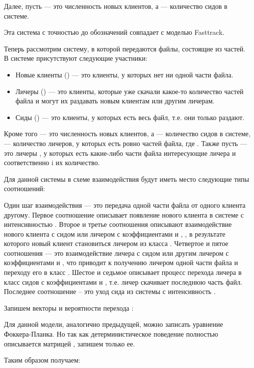 \documentclass[floatfix,
showkeys,
twocolumn, nofootinbib, superscriptaddress, ]{revtex4-1}
\begin{document}
Далее, пусть  --- это численность новых клиентов, а  ---
количество сидов в системе.

Эта система с точностью до обозначений совпадает с моделью Fasttrack.

Теперь рассмотрим систему, в которой передаются файлы, состоящие из
 частей. В системе присутствуют следующие участники:

\begin{itemize}
\item Новые клиенты () --- это клиенты, у которых нет ни одной
  части файла.
\item Личеры () --- это клиенты, которые уже скачали какое-то
  количество частей файла и могут их раздавать новым клиентам или
  другим личерам.
\item Сиды () --- это клиенты, у которых есть весь файл, т.е. они
  только раздают.
\end{itemize}

Кроме того  --- это численность новых клиентов, а  ---
количество сидов в системе,  --- количество личеров, у которых
есть ровно  частей файла, где . Также пусть  --- это личеры , у которых есть какие-либо части файла
интересующие личера  и соответственно i их
количество.

Для данной системы в схеме взаимодействия будут иметь место следующие
типы соотношений:


Один шаг взаимодействия --- это передача одной части файла от одного
клиента другому. Первое соотношение описывает появление нового клиента
в системе с интенсивностью . Второе и третье соотношения
описывают взаимодействие нового клиента с сидом или личером с
коэффициентами  и , , в
результате которого новый клиент становиться личером из класса 
. Четвертое и пятое соотношения --- это взаимодействие личера  с
сидом или другим личером с коэффициентами  и 
, что приводит к получению личером одной части
файла и переходу его в класс .  Шестое и седьмое описывает
процесс перехода личера в класс сидов с коэффициентами 
и , т.е. личер скачивает последнюю часть файл. Последнее
соотношение – это уход сида из системы с интенсивность .

Запишем векторы  и 
вероятности перехода :




Для данной модели, аналогично предыдущей, можно записать уравнение
Фоккера-Планка. Но так как детерминистическое поведение полностью
описывается матрицей , запишем только ее.

Таким образом получаем:
\end{document}
